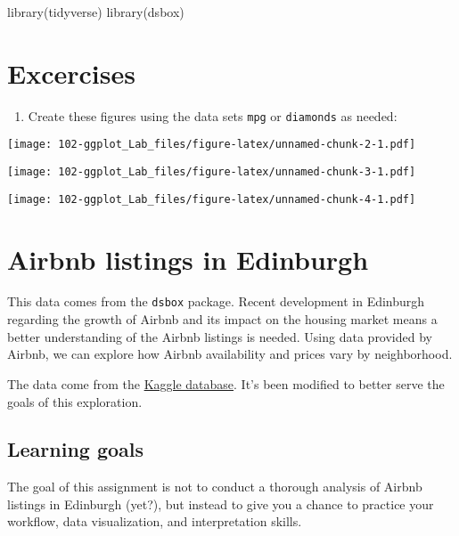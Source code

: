 \documentclass[
]{book}
\newenvironment{Shaded}{\begin{snugshade}}{\end{snugshade}}
\newcommand{\FunctionTok}[1]{\textcolor[rgb]{0.00,0.00,0.00}{#1}}
\newcommand{\NormalTok}[1]{#1}
\providecommand{\tightlist}{%
  \setlength{\itemsep}{0pt}\setlength{\parskip}{0pt}}
\begin{document}
\begin{Shaded}
\begin{Highlighting}[]
\FunctionTok{library}\NormalTok{(tidyverse)}
\FunctionTok{library}\NormalTok{(dsbox)}
\end{Highlighting}
\end{Shaded}

\hypertarget{excercises}{%
\section{Excercises}\label{excercises}}

\begin{enumerate}
\def\labelenumi{\arabic{enumi}.}
\tightlist
\item
  Create these figures using the data sets \texttt{mpg} or \texttt{diamonds} as needed:
\end{enumerate}

\texttt{[image: 102-ggplot\_Lab\_files/figure-latex/unnamed-chunk-2-1.pdf]}

\texttt{[image: 102-ggplot\_Lab\_files/figure-latex/unnamed-chunk-3-1.pdf]}

\texttt{[image: 102-ggplot\_Lab\_files/figure-latex/unnamed-chunk-4-1.pdf]}

\hypertarget{airbnb-listings-in-edinburgh}{%
\section{Airbnb listings in Edinburgh}\label{airbnb-listings-in-edinburgh}}

This data comes from the \texttt{dsbox} package. Recent development in Edinburgh regarding the growth of Airbnb and its impact on the housing market means a better understanding of the Airbnb listings is needed. Using data provided by Airbnb, we can explore how Airbnb availability and prices vary by neighborhood.

The data come from the \href{https://www.kaggle.com/thoroc/edinburgh-inside-airbnb/version/2}{Kaggle database}. It's
been modified to better serve the goals of this exploration.

\hypertarget{learning-goals}{%
\subsection{Learning goals}\label{learning-goals}}

The goal of this assignment is not to conduct a thorough analysis of Airbnb listings in Edinburgh (yet?), but instead to give you a chance to practice your workflow, data visualization, and interpretation skills.
\end{document}
